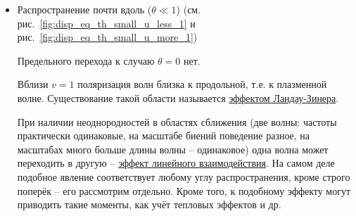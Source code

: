 \documentclass[10pt, a4paper]{article}
\begin{document}
\begin{itemize}
	\item Распространение почти вдоль ($\theta \ll 1$) (см. рис.~\ref{fig:disp_eq_th_small_u_less_1} и рис.~\ref{fig:disp_eq_th_small_u_more_1})

	Предельного перехода к случаю $\theta=0$ нет.
	
	Вблизи $v=1$ поляризация волн близка к продольной, т.е. к плазменной волне. Существование такой области называется \uline{эффектом Ландау-Зинера}.
	
	При наличии неоднородностей в областях сближения (две волны: частоты практически одинаковые, на масштабе биений поведение разное, на масштабах много больше длины волны -- одинаковое) одна волна может переходить в другую -- \uline{эффект линейного взаимодействия}. На самом деле подобное явление соответствует любому углу распространения, кроме строго поперёк -- его рассмотрим отдельно. Кроме того, к подобному эффекту могут приводить такие моменты, как учёт тепловых эффектов и др.


\end{itemize}
\end{document}
